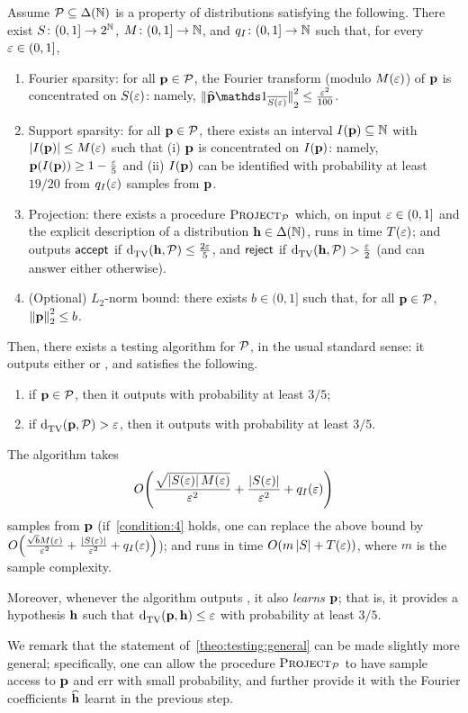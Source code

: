 \begin{theorem}\label{theo:testing:general}
Assume $\mathcal{P}\subseteq \Delta\!\left(\mathbb{N}\right)$ is a property of distributions satisfying the following. There exist $S\colon(0,1]\to 2^{\mathbb{N}}$, $M\colon (0,1]\to\mathbb{N}$, and $q_I\colon (0,1]\to\mathbb{N}$ such that, for every $\varepsilon\in(0,1]$,
\begin{enumerate}
  \item\label{condition:1} \textsf{Fourier sparsity:} for all $\mathbf{p}\in\mathcal{P}$, the Fourier transform (modulo $M(\varepsilon)$) of $\mathbf{p}$ is concentrated on $S(\varepsilon)$: namely,
  $
      \normtwo{\fourier{\p}\indicSet{\overline{S(\eps)}}}^2 \leq \frac{\eps^2}{100}
  $.
  \item\label{condition:2} \textsf{Support sparsity:} for all $\mathbf{p}\in\mathcal{P}$, there exists an interval $I(\mathbf{p})\subseteq \mathbb{N}$ with $\left\lvert I(\mathbf{p}) \right\rvert \leq M(\varepsilon)$ such that (i) $\mathbf{p}$ is concentrated on $I(\mathbf{p})$: namely,
  $
      \mathbf{p}(I(\mathbf{p})) \geq 1-\frac{\varepsilon}{5}
  $ and (ii) $I(\mathbf{p})$ can be identified with probability at least $19/20$ from $q_I(\varepsilon)$ samples from $\mathbf{p}$.
  \item\label{condition:3} \textsf{Projection:} there exists a procedure $\textsc{Project}_{\mathcal{P}}$ which, on input $\varepsilon\in(0,1]$ and the explicit description of a distribution $\mathbf{h}\in\Delta\!\left(\mathbb{N}\right)$, runs in time $T(\varepsilon)$; and outputs $\textsf{accept}$ if ${\operatorname{d}_{\textrm{TV}}^{}\!\left({\mathbf{h}, \mathcal{P}}\right)}\leq \frac{2\varepsilon}{5}$, and $\textsf{reject}$ if ${\operatorname{d}_{\textrm{TV}}^{}\!\left({\mathbf{h}, \mathcal{P}}\right)} > \frac{\varepsilon}{2}$ (and can answer either otherwise).
  \item\label{condition:4} \textsf{(Optional) $L_2$-norm bound:} there exists $b\in(0,1]$ such that, for all $\mathbf{p}\in\mathcal{P}$, ${\lVert\mathbf{p}{\rVert}}_2^2 \leq b$.
\end{enumerate}
Then, there exists a testing algorithm for $\mathcal{P}$, in the usual standard sense: it outputs either \accept or \reject, and satisfies the following.
    \begin{enumerate}
        \item if $\mathbf{p} \in \mathcal{P}$, then it outputs \accept with probability at least $3/5$;
        \item if $ {\operatorname{d}_{\textrm{TV}}^{}\!\left({\mathbf{p}, \mathcal{P}}\right)} > \varepsilon$, then it outputs \reject with probability at least $3/5$.
    \end{enumerate}
The algorithm takes 
\[
    \bigO{ \frac{\sqrt{\abs{S(\eps)}M(\eps)}}{\eps^2} + \frac{\abs{S(\eps)}}{\eps^2} + q_I(\eps)  }
\] samples from $\mathbf{p}$ (if~\cref{condition:4} holds, one can replace the above bound by
$
    \bigO{ \frac{\sqrt{b}M(\eps)}{\eps^2} + \frac{\abs{S(\eps)}}{\eps^2} + q_I(\eps)  }
$); and runs in time $\bigO{m\abs{S} + T(\eps)}$, where $m$ is the sample complexity.

Moreover, whenever the algorithm outputs \accept, it also \emph{learns} $\mathbf{p}$; that is, it provides a hypothesis $\mathbf{h}$ such that ${\operatorname{d}_{\textrm{TV}}^{}\!\left({\mathbf{p}, \mathbf{h}}\right)} \leq \varepsilon$ with probability at least $3/5$.
\end{theorem}
We remark that the statement of~\cref{theo:testing:general} can be made slightly more general; specifically, one can allow the procedure $\textsc{Project}_{\mathcal{P}}$ to have sample access to $\mathbf{p}$ and err with small probability, and further provide it with the Fourier coefficients $\widehat{\mathbf{h}}$ learnt in the previous step.


